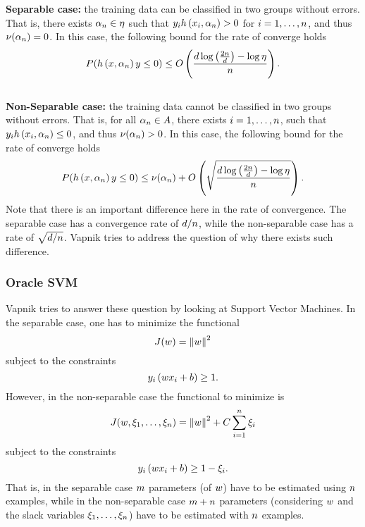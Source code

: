 \textbf{Separable case:} the training data can be classified in two groups without errors. That is, there exists $\alpha_n \in \eta$ such that $y_i h\left(x_i, \alpha_n\right) > 0$ for $i = 1, \ldots, n$, and thus $\nu(\alpha_n) = 0$.
In this case, the following bound for the rate of converge holds
\begin{equation}
    \nonumber
    P(h\left(x, \alpha_n\right) y \leq 0) \leq O\left( \frac{d \log\left(\frac{2n}{d} \right) - \log\eta}{n}  \right) .
\end{equation}
\\
\textbf{Non-Separable case:} the training data cannot be classified in two groups without errors. That is, for all $\alpha_n \in A$, there exists $i = 1, \ldots, n$, such that $y_i h\left(x_i, \alpha_n\right) \leq 0$, and thus $\nu(\alpha_n) > 0$.
In this case, the following bound for the rate of converge holds
\begin{equation}
    \nonumber
    P(h\left(x, \alpha_n\right) y \leq 0) \leq \nu(\alpha_n) + O\left( \sqrt{\frac{d \log\left(\frac{2n}{d} \right) - \log\eta}{n}}  \right) .
\end{equation}
Note that there is an important difference here in the rate of convergence. The separable case has a convergence rate of $d/n$, while the non-separable case has a rate of $\sqrt{d/n}$. Vapnik tries to address the question of why there exists such difference.

\subsubsection*{Oracle SVM}
Vapnik tries to answer these question by looking at Support Vector Machines. In the separable case, one has to minimize the functional 
$$J(w) = \left\lVert w\right\rVert^2$$
subject to the constraints
$$y_i \left( w x_i + b \right) \geq 1.$$
However, in the non-separable case the functional to minimize is 
$$J(w, \xi_1, \ldots, \xi_n) = \left\lVert w\right\rVert^2 + C \sum_{i=1}^n \xi_i$$
subject to the constraints
$$y_i \left( w x_i + b \right) \geq 1 - \xi_i.$$
That is, in the separable case $m$ parameters (of $w$) have to be estimated using $n$ examples, while in the non-separable case $m + n$ parameters (considering $w$ and the slack variables $\xi_1, \ldots, \xi_n$) have to be estimated with $n$ examples. 

